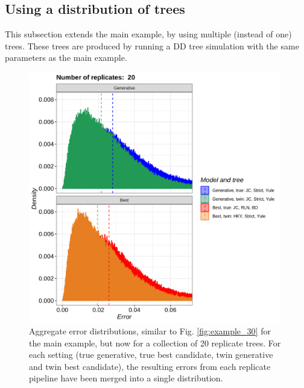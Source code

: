 











\clearpage
\newpage

\subsection{Using a distribution of trees}
\label{subsec:distribution}

This subsection extends the main example, by using multiple (instead of
one) trees. These trees are produced by running a DD tree simulation
with the same parameters as the main example.

\begin{figure}[H]
  \includegraphics[width=0.98\textwidth]{pirouette_example_28/errors.png}
  \caption{
    Aggregate error distributions, similar to Fig. \ref{fig:example_30} 
    for the main example, but now for a collection of 20 replicate trees. 
    For each setting (true generative, true best candidate, twin generative 
    and twin best candidate), the resulting errors from each replicate 
    pipeline have been merged into a single distribution.
  }
  \label{fig:replicate_trees}
\end{figure}

